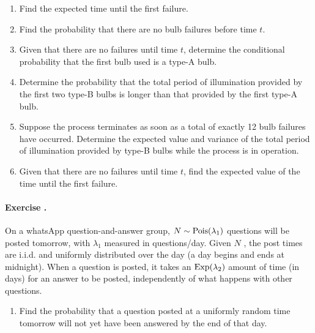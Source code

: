 \documentclass[twocolumn,12pt,a4paper]{article}
\newcounter{num}  %
\begin{document}
	\begin{enumerate}
		\item Find the expected time until the first failure.
		\item Find the probability that there are no bulb failures before time $ t $.
		\item Given that there are no failures until time $ t $, determine the conditional probability that the first bulb used is a type-A bulb.
		\item Determine the probability that the total period of illumination provided by the first two type-B bulbs is longer than that provided by the first type-A bulb.
		\item Suppose the process terminates as soon as a total of exactly 12 bulb failures have occurred. Determine the expected value and variance of the total period of illumination provided by type-B bulbs while the process is in operation.
		\item Given that there are no failures until time $ t $, find the expected value of the time until the first failure.
	\end{enumerate}
	
	
	
	
	\paragraph{Exercise \thenum.}
On a whatsApp question-and-answer group, $N \sim {\rm Pois}(\lambda_1)$ questions will be posted tomorrow, with $\lambda_1$ measured in questions/day. 
Given $N$ , the post times are i.i.d. and uniformly distributed over the day (a day begins and ends at midnight). 
When a question is posted, it takes an ${\rm Exp}(\lambda_2)$ amount of time (in days) for an answer to be posted,
independently of what happens with other questions.
\begin{enumerate}
	\item Find the probability that a question posted at a uniformly random time tomorrow will not yet have been answered by the end of that day.
\end{enumerate}
	
	
	
	
	\iffalse
	\stepcounter{num} 
	\paragraph{Exercise \thenum.}
	Bees in a forest are distributed according to a 3D Poisson process with rate $\lambda$. 
	What is the distribution of the distance from a hiker to the nearest bee?
	\fi
	
\end{document}

